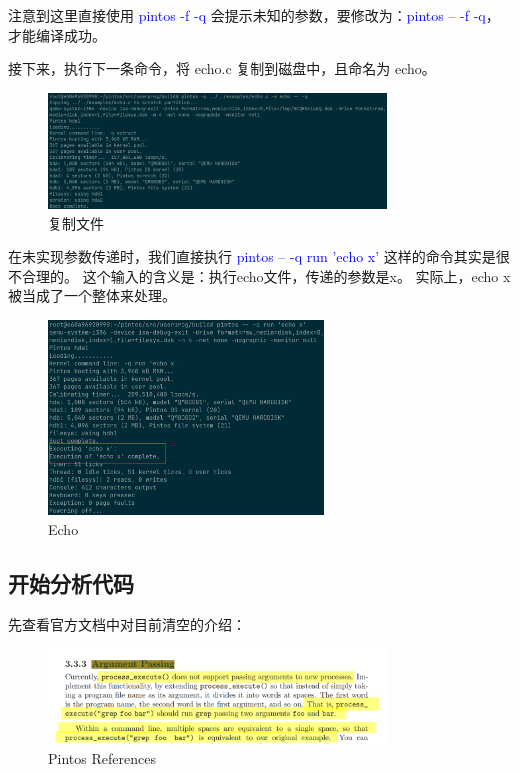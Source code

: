 \documentclass[14pt,a4paper,UTF8,twoside]{article}
\renewcommand{\texttt}[1]{\textcolor{blue}{\ttfamily #1}}
\begin{document}
注意到这里直接使用 \texttt{pintos -f -q} 会提示未知的参数，要修改为：\texttt{pintos -- -f -q}，才能编译成功。

接下来，执行下一条命令，将 echo.c 复制到磁盘中，且命名为 echo。

\begin{figure}[H]
    \centering
    \includegraphics[width=0.8\textwidth]{img5/copy.png}
    \caption{复制文件}
    \label{fig:copyfile}
\end{figure}

在未实现参数传递时，我们直接执行 \texttt{pintos -- -q run 'echo x'} 这样的命令其实是很不合理的。
这个输入的含义是：执行echo文件，传递的参数是x。 实际上，echo x 被当成了一个整体来处理。

\begin{figure}[H]
    \centering
    \includegraphics[width=0.65\textwidth]{img5/echo.png}
    \caption{Echo}
    \label{fig:echo}
\end{figure}

\subsection{开始分析代码}

先查看官方文档中对目前清空的介绍：

\begin{figure}[H]
    \centering
    \includegraphics[width=0.8\textwidth]{img5/ref.png}
    \caption{Pintos References}
    \label{fig:ref}
\end{figure}
\end{document}
